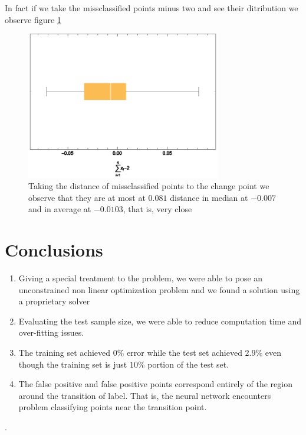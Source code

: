 \documentclass[a4paper,10pt,twocolumn]{article}
\begin{document}
In fact if we take the missclassified points minus two and see their ditribution we observe figure \ref{dist}

\begin{figure}[!ht]
\begin{center}
\includegraphics[width=8.5cm]{dist.eps}
\caption{Taking the distance of missclassified points to the change point we observe that they are at most at $0.081$ distance in median at $-0.007$ and in average at $-0.0103$, that is, very close\label{dist}}
\end{center}
\end{figure}

\section{Conclusions}

\begin{enumerate}
\item Giving a special treatment to the problem, we were able to pose an unconstrained non linear optimization problem and we found a solution using a proprietary solver 
\item Evaluating the test sample size, we were able to reduce computation time and over-fitting issues.
\item The training set achieved $0\%$ error while the test set achieved $2.9\%$ even though the training set is just $10\%$ portion of the test set.
\item The false positive and false positive points correspond entirely of the region around the transition of label. That is, the neural network encounters problem classifying points near the transition point.
\end{enumerate}

\newpage
.
\newpage
\end{document}
